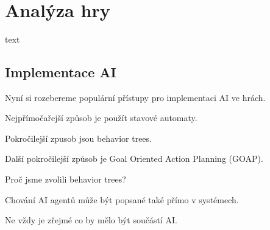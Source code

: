 \\\\
\\\\
\\\\
\\\\

\section{Analýza hry}

text

\subsection{Implementace AI}

Nyní si rozebereme populární přístupy pro implementaci AI ve hrách.

Nejpřímočařejší způsob je použít stavové automaty.

Pokročilejší zpusob jsou behavior trees.

Další pokročilejší způsob je Goal Oriented Action Planning (GOAP).

Proč jsme zvolili behavior trees?

Chování AI agentů může být popsané také přímo v systémech.

Ne vždy je zřejmé co by mělo být součástí AI.


